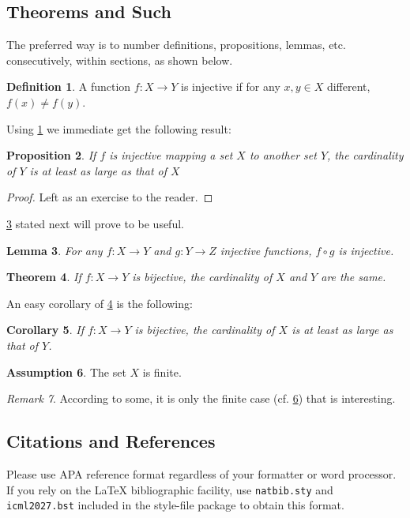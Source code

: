\documentclass{article}
\theoremstyle{plain}
\newtheorem{theorem}{Theorem}[section]
\newtheorem{proposition}[theorem]{Proposition}
\newtheorem{lemma}[theorem]{Lemma}
\newtheorem{corollary}[theorem]{Corollary}
\theoremstyle{definition}
\newtheorem{definition}[theorem]{Definition}
\newtheorem{assumption}[theorem]{Assumption}
\theoremstyle{remark}
\newtheorem{remark}[theorem]{Remark}
\begin{document}
\subsection{Theorems and Such}
The preferred way is to number definitions, propositions, lemmas, etc.
consecutively, within sections, as shown below.
\begin{definition}
  \label{def:inj}
  A function $f:X \to Y$ is injective if for any $x,y\in X$ different, $f(x)\ne
    f(y)$.
\end{definition}
Using \cref{def:inj} we immediate get the following result:
\begin{proposition}
  If $f$ is injective mapping a set $X$ to another set $Y$,
  the cardinality of $Y$ is at least as large as that of $X$
\end{proposition}
\begin{proof}
  Left as an exercise to the reader.
\end{proof}
\cref{lem:usefullemma} stated next will prove to be useful.
\begin{lemma}
  \label{lem:usefullemma}
  For any $f:X \to Y$ and $g:Y\to Z$ injective functions, $f \circ g$ is
  injective.
\end{lemma}
\begin{theorem}
  \label{thm:bigtheorem}
  If $f:X\to Y$ is bijective, the cardinality of $X$ and $Y$ are the same.
\end{theorem}
An easy corollary of \cref{thm:bigtheorem} is the following:
\begin{corollary}
  If $f:X\to Y$ is bijective,
  the cardinality of $X$ is at least as large as that of $Y$.
\end{corollary}
\begin{assumption}
  The set $X$ is finite.
  \label{ass:xfinite}
\end{assumption}
\begin{remark}
  According to some, it is only the finite case (cf. \cref{ass:xfinite}) that
  is interesting.
\end{remark}

\subsection{Citations and References}

Please use APA reference format regardless of your formatter or word processor.
If you rely on the \LaTeX\/ bibliographic facility, use \texttt{natbib.sty} and
\texttt{icml2027.bst} included in the style-file package to obtain this format.
\end{document}
